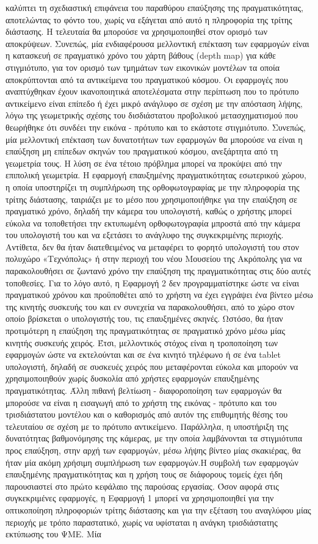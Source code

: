 καλύπτει τη σχεδιαστική επιφάνεια του παραθύρου επαύξησης της πραγματικότητας, αποτελώντας το φόντο του, χωρίς να εξάγεται από αυτό η πληροφορία της τρίτης διάστασης. Η τελευταία θα μπορούσε να χρησιμοποιηθεί στον ορισμό των αποκρύψεων. Συνεπώς, μία ενδιαφέρουσα μελλοντική επέκταση των εφαρμογών είναι η κατασκευή σε πραγματικό χρόνο του χάρτη βάθους (depth map) για κάθε στιγμιότυπο, για τον ορισμό των τμημάτων των εικονικών μοντέλων τα οποία αποκρύπτονται από τα αντικείμενα του πραγματικού κόσμου. Οι εφαρμογές που αναπτύχθηκαν έχουν ικανοποιητικά αποτελέσματα στην περίπτωση που το πρότυπο αντικείμενο είναι επίπεδο ή έχει μικρό ανάγλυφο σε σχέση με την απόσταση λήψης, λόγω της γεωμετρικής σχέσης του δισδιάστατου προβολικού μετασχηματισμού που θεωρήθηκε ότι συνδέει την εικόνα - πρότυπο και το εκάστοτε στιγμιότυπο. Συνεπώς, μία μελλοντική επέκταση των δυνατοτήτων των εφαρμογών θα μπορούσε να είναι η επαύξηση μη επίπεδων σκηνών του πραγματικού κόσμου, ανεξάρτητα από τη γεωμετρία τους. Η λύση σε ένα τέτοιο πρόβλημα μπορεί να προκύψει από την επιπολική γεωμετρία. Η εφαρμογή επαυξημένης πραγματικότητας εσωτερικού χώρου, η οποία υποστηρίζει τη συμπλήρωση της ορθοφωτογραφίας με την πληροφορία της τρίτης διάστασης, ταιριάζει με το μέσο που χρησιμοποιήθηκε για την επαύξηση σε πραγματικό χρόνο, δηλαδή την κάμερα του υπολογιστή, καθώς ο χρήστης μπορεί εύκολα να τοποθετήσει την εκτυπωμένη ορθοφωτογραφία μπροστά από την κάμερα του υπολογιστή του και να εξετάσει το ανάγλυφο της συγκεκριμένης περιοχής. Αντίθετα, δεν θα ήταν διατεθειμένος να μεταφέρει το φορητό υπολογιστή του στον πολυχώρο «Τεχνόπολις» ή στην περιοχή του νέου Μουσείου της Ακρόπολης για να παρακολουθήσει σε ζωντανό χρόνο την επαύξηση της πραγματικότητας στις δύο αυτές τοποθεσίες. Για το λόγο αυτό, η Εφαρμογή 2 δεν προγραμματίστηκε ώστε να είναι πραγματικού χρόνου και προϋποθέτει από το χρήστη να έχει εγγράψει ένα βίντεο μέσω της κινητής συσκευής του και εν συνεχεία να παρακολουθήσει, από το χώρο στον οποίο βρίσκεται ο υπολογιστής του, τις επαυξημένες σκηνές. Ωστόσο, θα ήταν προτιμότερη η επαύξηση της πραγματικότητας σε πραγματικό χρόνο μέσω μίας κινητής συσκευής χειρός. Έτσι, μελλοντικός στόχος είναι η τροποποίηση των εφαρμογών ώστε να εκτελούνται και σε ένα κινητό τηλέφωνο ή σε ένα tablet υπολογιστή, δηλαδή σε συσκευές χειρός που μεταφέρονται εύκολα και μπορούν να χρησιμοποιηθούν χωρίς δυσκολία από χρήστες εφαρμογών επαυξημένης πραγματικότητας. Άλλη πιθανή βελτίωση - διαφοροποίηση των εφαρμογών θα μπορούσε να είναι η εισαγωγή από το χρήστη της εικόνας - πρότυπο και του τρισδιάστατου μοντέλου και ο καθορισμός από αυτόν της επιθυμητής θέσης του τελευταίου σε σχέση με το πρότυπο αντικείμενο. Παράλληλα, η υποστήριξη της δυνατότητας βαθμονόμησης της κάμερας, με την οποία λαμβάνονται τα στιγμιότυπα προς επαύξηση, στην αρχή των εφαρμογών, μέσω λήψης βίντεο μίας σκακιέρας, θα ήταν μία ακόμη χρήσιμη συμπλήρωση των εφαρμογών.Η συμβολή των εφαρμογών επαυξημένης πραγματικότητας και η χρήση τους σε διάφορους τομείς έχει ήδη παρουσιαστεί στο πρώτο κεφάλαιο της παρούσας εργασίας. Όσον αφορά στις συγκεκριμένες εφαρμογές, η Εφαρμογή 1 μπορεί να χρησιμοποιηθεί για την οπτικοποίηση πληροφοριών τρίτης διάστασης και για την εξέταση του αναγλύφου μίας περιοχής με τρόπο παραστατικό, χωρίς να υφίσταται η ανάγκη τρισδιάστατης εκτύπωσης του ΨΜΕ. Μία 